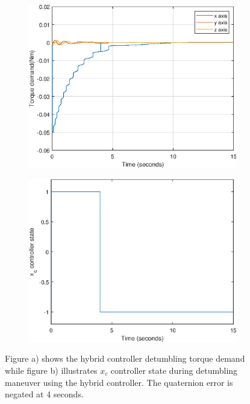 

\begin{figure}[H]
	\begin{subfigure}{0.5\linewidth}
			\centering
		\includegraphics[width=1\linewidth]{figures/hybridtorque}
		\caption{}
		\label{fig:detumbling}
	\end{subfigure}
	\begin{subfigure}{0.5\linewidth}
	\centering
\includegraphics[width=1\linewidth]{figures/xc}
		\caption{}
\label{fig:detumblingVar}
	\end{subfigure}
		\caption{Figure a) shows the hybrid controller detumbling torque demand while figure b) illustrates $x_c$ controller state during detumbling maneuver using the hybrid controller. The quaternion error is negated at 4 seconds.}
		
\end{figure}

